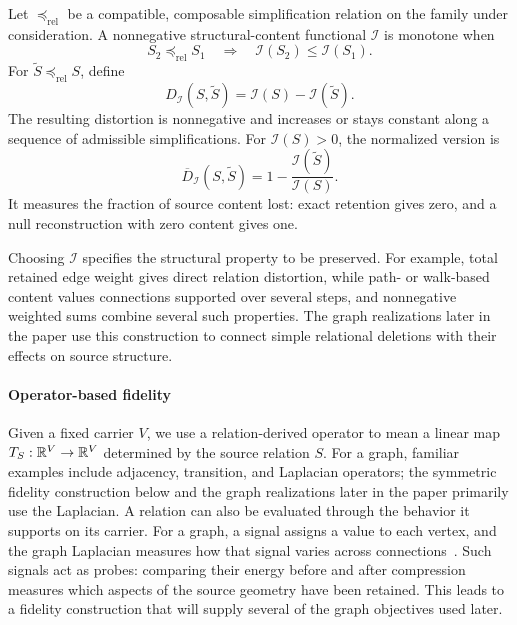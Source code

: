 Let $\preceq_{\mathrm{rel}}$ be a compatible, composable simplification relation on the family under consideration.
A nonnegative structural-content functional $\mathcal I$ is monotone when
\begin{equation}
S_2\preceq_{\mathrm{rel}}S_1
\quad\Longrightarrow\quad
\mathcal I(S_2)\le\mathcal I(S_1).
\label{eq:relational-content-monotone}
\end{equation}
For $\widetilde S\preceq_{\mathrm{rel}}S$, define
\begin{equation}
D_{\mathcal I}(S,\widetilde S)
=\mathcal I(S)-\mathcal I(\widetilde S).
\label{eq:relational-content-distortion}
\end{equation}
The resulting distortion is nonnegative and increases or stays constant along a sequence of admissible simplifications.
For $\mathcal I(S)>0$, the normalized version is
\begin{equation}
\overline D_{\mathcal I}(S,\widetilde S)
=1-\frac{\mathcal I(\widetilde S)}{\mathcal I(S)}.
\label{eq:normalized-relational-content-distortion}
\end{equation}
It measures the fraction of source content lost: exact retention gives zero, and a null reconstruction with zero content gives one.

Choosing $\mathcal I$ specifies the structural property to be preserved.
For example, total retained edge weight gives direct relation distortion, while path- or walk-based content values connections supported over several steps, and nonnegative weighted sums combine several such properties.
The graph realizations later in the paper use this construction to connect simple relational deletions with their effects on source structure.

\paragraph{Operator-based fidelity}

Given a fixed carrier $V$, we use a relation-derived operator to mean a linear map $T_S:\mathbb{R}^V\to\mathbb{R}^V$ determined by the source relation $S$.
For a graph, familiar examples include adjacency, transition, and Laplacian operators; the symmetric fidelity construction below and the graph realizations later in the paper primarily use the Laplacian.
A relation can also be evaluated through the behavior it supports on its carrier.
For a graph, a signal assigns a value to each vertex, and the graph Laplacian measures how that signal varies across connections~\citep{shuman2013emerging}.
Such signals act as probes: comparing their energy before and after compression measures which aspects of the source geometry have been retained.
This leads to a fidelity construction that will supply several of the graph objectives used later.

